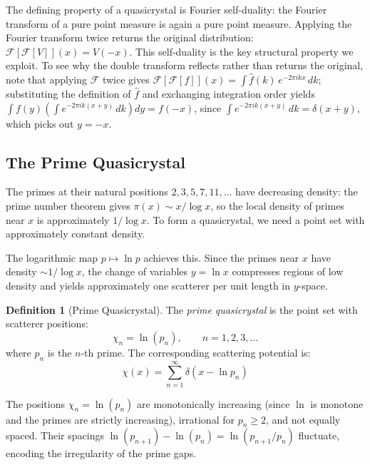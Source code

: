 \documentclass[11pt, oneside]{article}
\theoremstyle{definition}
\newtheorem{definition}[theorem]{Definition}
\begin{document}
The defining property of a quasicrystal is Fourier self-duality:
the Fourier transform of a pure point measure is again a pure
point measure. Applying the Fourier transform twice returns the
original distribution: $\mathcal{F}[\mathcal{F}[V]](x) = V(-x)$.
This self-duality is the key structural property we exploit.
To see why the double transform reflects rather than returns the
original, note that applying $\mathcal{F}$ twice gives
$\mathcal{F}[\mathcal{F}[f]](x)
= \int \hat{f}(k)\,e^{-2\pi ikx}\,dk$;
substituting the definition of $\hat{f}$ and exchanging
integration order yields
$\int f(y)\left(\int e^{-2\pi ik(x+y)}\,dk\right)dy = f(-x)$,
since $\int e^{-2\pi ik(x+y)}\,dk = \delta(x+y)$,
which picks out $y = -x$.

\subsection{The Prime Quasicrystal}

The primes at their natural positions $2, 3, 5, 7, 11, \ldots$ have
decreasing density: the prime number theorem gives
$\pi(x) \sim x/\log x$, so the local density of primes near $x$ is
approximately $1/\log x$. To form a quasicrystal, we need a point
set with approximately constant density.

The logarithmic map $p \mapsto \ln p$ achieves this. Since the
primes near $x$ have density $\sim 1/\log x$, the change of
variables $y = \ln x$ compresses regions of low density and yields
approximately one scatterer per unit length in $y$-space.

\begin{definition}[Prime Quasicrystal]
\label{def:chi}
The \emph{prime quasicrystal} is the point set with scatterer
positions:
\begin{equation}
\chi_n = \ln(p_n), \qquad n = 1, 2, 3, \ldots
\end{equation}
where $p_n$ is the $n$-th prime. The corresponding scattering
potential is:
\begin{equation}
\chi(x) = \sum_{n=1}^{\infty} \delta\!\left(x - \ln p_n\right)
\end{equation}
\end{definition}

The positions $\chi_n = \ln(p_n)$ are monotonically increasing
(since $\ln$ is monotone and the primes are strictly increasing),
irrational for $p_n \geq 2$, and not equally spaced.
Their spacings $\ln(p_{n+1}) - \ln(p_n) = \ln(p_{n+1}/p_n)$
fluctuate, encoding the irregularity of the prime gaps.
\end{document}
